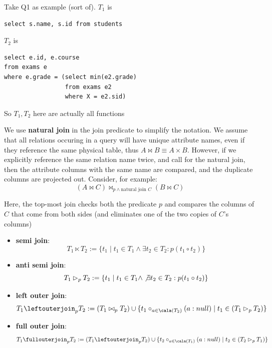 \documentclass[11pt]{article}
\begin{document}
Take Q1 as example (sort of). \(T_1\) is
\begin{verbatim}
select s.name, s.id from students
\end{verbatim}
\(T_2\) is
\begin{verbatim}
select e.id, e.course
from exams e
where e.grade = (select min(e2.grade)
                 from exams e2
                 where X = e2.sid)
\end{verbatim}
So \(T_1, T_2\) here are actually all functions


We use \textbf{natural join} in the join predicate to simplify the notation. We assume that all relations
occuring in a query will have unique attribute names, even if they reference the same physical table,
thus \(A\bowtie B\equiv A\times B\). However, if we explicitly reference the same relation name twice,
and call for the natural join, then the attribute columns with the same name are compared, and the
duplicate columns are projected out. Consider, for example:
\begin{equation*}
(A\bowtie C)\bowtie_{p\wedge\text{natural join }C}(B\bowtie C)
\end{equation*}

Here, the top-most join checks both the predicate \(p\) and compares the columns of \(C\) that come
from both sides (and eliminates one of the two copies of \(C\)'s columns)

\begin{itemize}
\item \textbf{semi join}:
\begin{equation*}
T_1\ltimes T_2:=\{t_1\mid t_1\in T_1\wedge \exists t_2\in T_2:p(t_1\circ t_2)\}
\end{equation*}
\item \textbf{anti semi join}:
\begin{equation*}
T_1\rhd_pT_2:=\{t_1\mid t_1\in T_1\wedge\not\exists t_2\in T_2:p(t_1\circ t_2)\}
\end{equation*}
\item \textbf{left outer join}:
\begin{equation*}
T_1\leftouterjoin_pT_2:=(T_1\bowtie_pT_2)\cup\{t_1\circ_{a\in\cala(T_2)}(a:null)\mid
t_1\in(T_1\rhd_pT_2)\}
\end{equation*}
\item \textbf{full outer join}:
\begin{equation*}
T_1\fullouterjoin_p T_2:=(T_1\leftouterjoin_p T_2)\cup\{t_2\circ_{a\in\cala(T_1)}(a:null)\mid t_2\in(T_2\rhd_pT_1)\}
\end{equation*}
\end{itemize}
\end{document}
